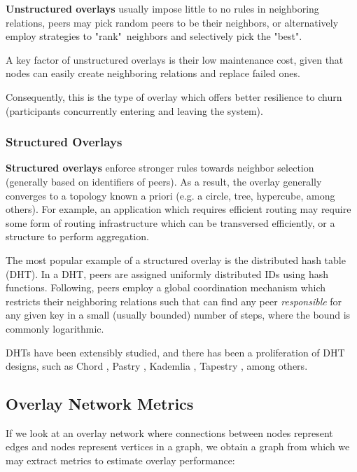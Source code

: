 \textbf{Unstructured overlays} usually impose little to no rules in neighboring relations, peers may pick random peers to be their neighbors, or alternatively employ strategies to "rank"\ neighbors and selectively pick the "best". 

A key factor of unstructured overlays is their low maintenance cost, given that nodes can easily create neighboring relations and replace failed ones. 

Consequently, this is the type of overlay which offers better resilience to churn \cite{stutzbach2006understanding} (participants concurrently entering and leaving the system).

\subsubsection{Structured Overlays} 

\textbf{Structured overlays} enforce stronger rules towards neighbor selection (generally based on identifiers of peers). As a result, the overlay generally converges to a topology known a priori (e.g. a circle, tree, hypercube, among others). For example, an application which requires efficient routing may require some form of routing infrastructure which can be transversed efficiently, or a structure to perform aggregation. 

The most popular example of a structured overlay is the distributed hash table (DHT). In a DHT, peers are assigned uniformly distributed IDs using hash functions. Following, peers employ a global coordination mechanism which restricts their neighboring relations such that can find  any peer \textit{responsible} for any given key in a small (usually bounded) number of steps, where the bound is commonly logarithmic.

DHTs have been extensibly studied, and there has been a proliferation of DHT designs, such as Chord \cite{stoica2003chord}, Pastry \cite{rowstron2001pastry}, Kademlia \cite{maymounkov2002kademlia}, Tapestry \cite{tapestry}, among others.

\subsection{Overlay Network Metrics}

If we look at an overlay network where connections between nodes represent edges and nodes represent vertices in a graph, we obtain a graph from which we may extract metrics to estimate overlay performance:

